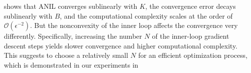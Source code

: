 \documentclass{osudissert96}
\newtheorem{proposition}{Proposition}
\begin{document}
 shows that ANIL converges sublinearly with $K$, the convergence error decays sublinearly with $B$, and the computational complexity scales at the order of $\mathcal{O}(\epsilon^{-2})$. But the nonconvexity of the inner loop affects the convergence very differently. Specifically, increasing the number $N$ of the inner-loop gradient descent steps yields slower convergence and higher computational complexity. This suggests to choose a relatively small $N$ for an efficient optimization process, which is demonstrated in our experiments in 


%
\end{document}
